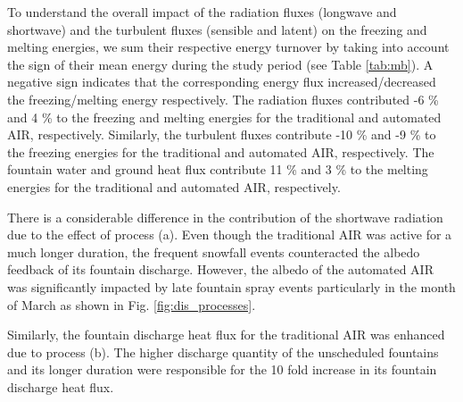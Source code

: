 \documentclass[tc, manuscript]{copernicus}
\begin{document}
To understand the overall impact of the radiation fluxes (longwave and shortwave) and the turbulent fluxes
(sensible and latent) on the freezing and melting energies, we sum their respective energy turnover by taking
into account the sign of their mean energy during the study period (see Table \ref{tab:mb}). A negative sign
indicates that the corresponding energy flux increased/decreased the freezing/melting energy respectively.  The
radiation fluxes contributed -6 \% and 4 \% to the freezing and melting energies for the traditional and
automated AIR, respectively.  Similarly, the turbulent fluxes contribute -10 \% and -9 \% to the freezing
energies for the traditional and automated AIR, respectively. The fountain water and ground heat flux contribute
11 \% and 3 \% to the melting energies for the traditional and automated AIR, respectively. 

There is a considerable difference in the contribution of the shortwave radiation due to the effect of process
(a). Even though the traditional AIR was active for a much longer duration, the frequent snowfall events
counteracted the albedo feedback of its fountain discharge. However, the albedo of the automated AIR was
significantly impacted by late fountain spray events particularly in the month of March as shown in Fig.
\ref{fig:dis_processes}.

Similarly, the fountain discharge heat flux for the traditional AIR was enhanced due to process (b). The higher
discharge quantity of the unscheduled fountains and its longer duration were responsible for the 10 fold
increase in its fountain discharge heat flux.
\end{document}
